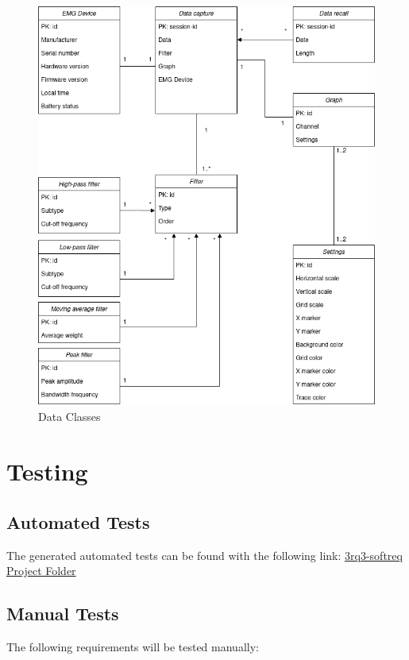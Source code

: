 \documentclass[12pt,a4paper]{article}
\begin{document}
\begin{figure}[h]
	\centering
	\includegraphics[scale=0.50]{Project Data Classes.png}
	\caption{Data Classes}
	\label{Data Classes}
\end{figure}


\section{Testing}

\subsection{Automated Tests}

The generated automated tests can be found with the following link: \href{https://github.com/gmarato/3rq3-softreq}{3rq3-softreq Project Folder}

\subsection{Manual Tests}

The following requirements will be tested manually:
\end{document}
